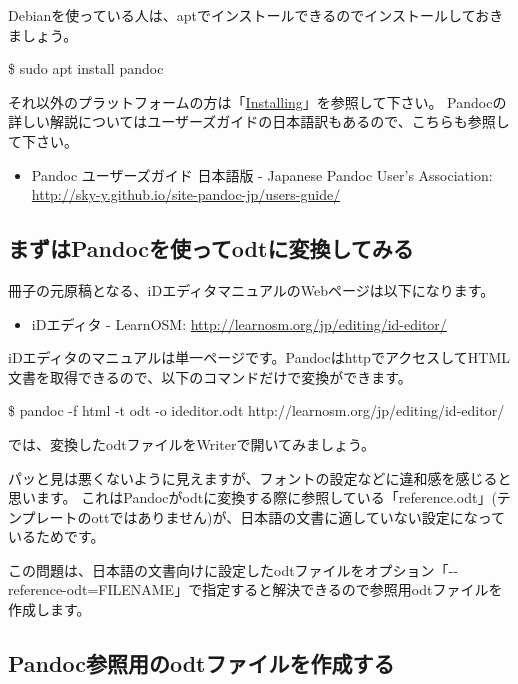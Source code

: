\documentclass[]{article}
\providecommand{\tightlist}{%
  \setlength{\itemsep}{0pt}\setlength{\parskip}{0pt}}
\begin{document}
Debianを使っている人は、aptでインストールできるのでインストールしておきましょう。

\$ sudo apt install pandoc

それ以外のプラットフォームの方は「\href{http://johnmacfarlane.net/pandoc/installing.html}{Installing}」を参照して下さい。
Pandocの詳しい解説についてはユーザーズガイドの日本語訳もあるので、こちらも参照して下さい。

\begin{itemize}
\tightlist
\item
  Pandoc ユーザーズガイド 日本語版 - Japanese Pandoc User's Association:
  \url{http://sky-y.github.io/site-pandoc-jp/users-guide/}
\end{itemize}

\subsection{まずはPandocを使ってodtに変換してみる}\label{ux307eux305aux306fpandocux3092ux4f7fux3063ux3066odtux306bux5909ux63dbux3057ux3066ux307fux308b}

冊子の元原稿となる、iDエディタマニュアルのWebページは以下になります。

\begin{itemize}
\tightlist
\item
  iDエディタ - LearnOSM: \url{http://learnosm.org/jp/editing/id-editor/}
\end{itemize}

iDエディタのマニュアルは単一ページです。PandocはhttpでアクセスしてHTML文書を取得できるので、以下のコマンドだけで変換ができます。

\$ pandoc -f html -t odt -o ideditor.odt
http://learnosm.org/jp/editing/id-editor/

では、変換したodtファイルをWriterで開いてみましょう。

パッと見は悪くないように見えますが、フォントの設定などに違和感を感じると思います。
これはPandocがodtに変換する際に参照している「reference.odt」(テンプレートのottではありません)が、日本語の文書に適していない設定になっているためです。

この問題は、日本語の文書向けに設定したodtファイルをオプション「-\/-reference-odt=FILENAME」で指定すると解決できるので参照用odtファイルを作成します。

\subsection{Pandoc参照用のodtファイルを作成する}\label{pandocux53c2ux7167ux7528ux306eodtux30d5ux30a1ux30a4ux30ebux3092ux4f5cux6210ux3059ux308b}
\end{document}
